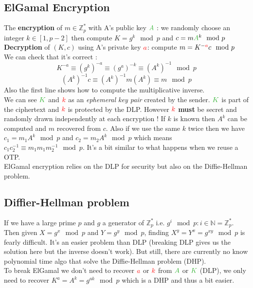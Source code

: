 \documentclass[11pt,a4paper]{report}
\newcommand{\tg}{\textcolor{ao}}
\newcommand{\tr}{\textcolor{red}}
\begin{document}
\subsection{ElGamal Encryption}
The \textbf{encryption} of $m \in \mathbb{Z}_p^*$ with A's public key $\tg{A}$ : we randomly choose an integer $k \in [1,p-2]$ then compute $K = g^k \mod p$ and $c = m \tg{A}^k \mod p$\\
\textbf{Decryption} of $(K,c)$ using A's private key $\tr{a}$: compute $m = K^{-\tr{a}} c \mod p$\\
We can check that it's correct :
$$K^{-a} \equiv (g^k)^{-a} \equiv (g^a)^{-k} \equiv (A^k)^{-1} \mod p$$
$$(A^k)^{-1} c \equiv (A^k)^{-1} m(A^k) \equiv m \mod p$$
Also the first line shows how to compute the multiplicative inverse.\\

We can see $\tg{K}$ and $\tr{k}$ as an \emph{ephemeral key pair} created by the sender. $\tg{K}$  is part of the ciphertext and $\tr{k}$ is protected by the DLP. However $\tr{k}$ \textbf{must} be secret and randomly drawn independently at each encryption ! If $k$ is known then $A^k$ can be computed and $m$ recovered from $c$. Also if we use the same $k$ twice then we have $c_1 = m_1 A^k \mod p$ and $c_2 = m_2 A^k \mod p$ which means $c_1 c_2^{-1} \equiv m_1 m_1 m_2^{-1} \mod p$. It's a bit similar to what happens when we reuse a OTP.\\
ElGamal encryption relies on the DLP for security but also on the Diffie-Hellman problem.

\subsection{Diffier-Hellman problem}
If we have a large prime $p$ and $g$ a generator of $\mathbb{Z}_p^*$ i.e. ${g^i \mod p : i \in \mathbb{N}} = \mathbb{Z}_p^*$. Then given $X = g^x \mod p$ and $Y = g^y \mod p$, finding $X^y = Y^x = g^{xy} \mod p$ is fearly difficult. It's an easier problem than DLP (breaking DLP gives us the solution here but the inverse doesn't work). But still, there are currently no know polynomial time algo that solve the Diffie-Hellman problem (DHP).\\

To break ElGamal we don't need to recover $\tr{a}$ or $\tr{k}$ from $\tg{A}$ or $\tg{K}$ (DLP), we only need to recover $K^a = A^k = g^{ak} \mod p$ which is a DHP and thus a bit easier.
\end{document}
